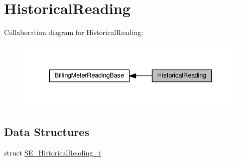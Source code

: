 \hypertarget{group__HistoricalReading}{}\section{Historical\+Reading}
\label{group__HistoricalReading}
Collaboration diagram for Historical\+Reading\+:\nopagebreak
\begin{figure}[H]
\begin{center}
\leavevmode
\includegraphics[width=336pt]{group__HistoricalReading}
\end{center}
\end{figure}
\subsection*{Data Structures}
\begin{DoxyCompactItemize}
\item 
struct \hyperlink{structSE__HistoricalReading__t}{S\+E\+\_\+\+Historical\+Reading\+\_\+t}
\end{DoxyCompactItemize}
